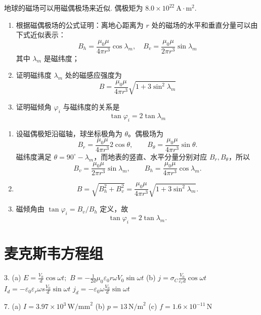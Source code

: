 \begin{exercise}\label{ex:19.11}
地球的磁场可以用磁偶极场来近似. 偶极矩为 $8.0 \times 10^{22} \ \mathrm{A \cdot m^2}$. 
\begin{enumerate}
  \item[(a)] 根据磁偶极场的公式证明：离地心距离为 $r$ 处的磁场的水平和垂直分量可以由下式近似表示：
  $$ B_h = \frac{\mu_0 \mu}{4\pi r^3} \cos\lambda_m, \quad B_v = \frac{\mu_0 \mu}{2\pi r^3} \sin\lambda_m $$
  其中 $\lambda_m$ 是磁纬度；
  \item[(b)] 证明磁纬度 $\lambda_m$ 处的磁感应强度为
  $$ B = \frac{\mu_0 \mu}{4\pi r^3} \sqrt{1 + 3\sin^2\lambda_m} $$
  \item[(c)] 证明磁倾角 $\varphi_i$ 与磁纬度的关系是
  $$ \tan\varphi_i = 2\tan\lambda_m $$
\end{enumerate}
\end{exercise}
\begin{solution}
\begin{enumerate}
\item[(a)] 设磁偶极矩沿磁轴，球坐标极角为 $\theta$。偶极场为
\[
B_r=\frac{\mu_0\mu}{4\pi r^3}2\cos\theta,\qquad
B_\theta=\frac{\mu_0\mu}{4\pi r^3}\sin\theta.
\]
磁纬度满足 $\theta=90^\circ-\lambda_m$，而地表的竖直、水平分量分别对应 $B_r,B_\theta$，所以
\[
\boxed{B_v=\frac{\mu_0\mu}{2\pi r^3}\sin\lambda_m},\qquad
\boxed{B_h=\frac{\mu_0\mu}{4\pi r^3}\cos\lambda_m}.
\]
\item[(b)]
\[
B=\sqrt{B_h^2+B_v^2}
=\boxed{\frac{\mu_0\mu}{4\pi r^3}\sqrt{1+3\sin^2\lambda_m}}.
\]
\item[(c)] 磁倾角由 $\tan\varphi_i=B_v/B_h$ 定义，故
\[
\boxed{\tan\varphi_i=2\tan\lambda_m}.
\]
\end{enumerate}
\end{solution}



\chapter{麦克斯韦方程组}

\begin{oddanswers}
3. (a) $E = \frac{V_0}{d} \cos \omega t;$
$B = -\frac{1}{2d} \mu_0 \varepsilon_0 r \omega V_0 \sin \omega t$
(b) $j = \sigma_C \frac{V_0}{\varepsilon_r d} \cos \omega t$
$I_d = -\varepsilon_0 \varepsilon_r \omega s \frac{V_0}{d} \sin \omega t$
$j_d = -\varepsilon_0 \omega \frac{V_0}{d} \sin \omega t$

7. (a) $I = 3.97 \times 10^3\,\mathrm{W/mm}^2$
(b) $p = 13\,\mathrm{N/m}^2$
(c) $f = 1.6 \times 10^{-11}\,\mathrm{N}$
\end{oddanswers}

